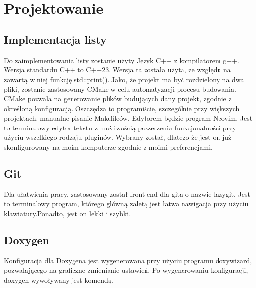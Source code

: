	\newpage
\section{Projektowanie}		%

\subsection{Implementacja listy}

Do zaimplementowania listy zostanie użyty Język C++ z kompilatorem g++. Wersja standardu C++ to C++23. Wersja ta została użyta, ze względu na zawartą w niej funkcję std::print(). Jako, że projekt ma być rozdzielony na dwa pliki, zostanie zastosowany CMake w celu automatyzacji procesu budowania. CMake pozwala na generowanie plików budujących dany projekt, zgodnie z określoną konfiguracją. Oszczędza to programiście, szczególnie przy większych projektach, manualne pisanie Makefileów. Edytorem będzie program Neovim. Jest to terminalowy edytor tekstu z możliwością poszerzenia funkcjonalności przy użyciu wszelkiego rodzaju pluginów. Wybrany został, dlatego że jest on już skonfigurowany na moim komputerze zgodnie z moimi preferencjami. 

\subsection{Git}

Dla ułatwienia pracy, zastosowany został front-end dla gita o nazwie lazygit. Jest to terminalowy program, którego główną zaletą jest łatwa nawigacja przy użyciu klawiatury.Ponadto, jest on lekki i szybki.

\subsection{Doxygen}

Konfiguracja dla Doxygena jest wygenerowana przy użyciu programu doxywizard, pozwalającego na graficzne zmienianie ustawień. Po wygenerowaniu konfiguracji, doxygen wywoływany jest komendą. 

